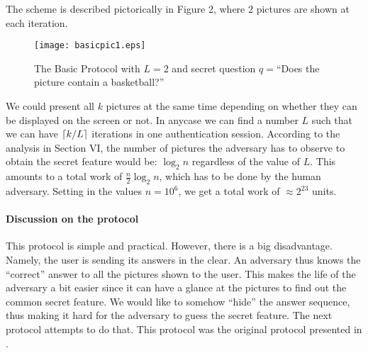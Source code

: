 \documentclass{llncs}
\begin{document}
The scheme is described pictorically in Figure 2, where $2$ pictures are shown at each iteration. 
\begin{figure}[ht]
\centerline{\texttt{[image: basicpic1.eps]}}
\caption{The Basic Protocol with $L=2$ and secret question $q=$``Does the picture contain a basketball?''}
\label{fig6}
\end{figure}
We could present all $k$ pictures at the same time depending on whether they can be displayed on the screen or not. In anycase we can find a number $L$ such that we can have $\left\lceil {{k \mathord{\left/
 {\vphantom {k L}} \right.
 \kern-\nulldelimiterspace} L}} \right\rceil $
iterations in one authentication session. According to the analysis in Section VI, the number of pictures the adversary has to observe to obtain the secret feature would be: $\log _2 n$ regardless of the value of $L$. This amounts to a total work of $\frac{n}{2}\log _2 n$, which has to be done by the human adversary. Setting in the values $n = 10^6$, we get a total work of $ \approx 2^{23} $ units.
\paragraph*{Discussion on the protocol} This protocol is simple and practical. However, there is a big disadvantage. Namely, the user is sending its answers in the clear. An adversary thus knows the ``correct'' answer to all the pictures shown to the user. This makes the life of the adversary a bit easier since it can have a glance at the pictures to find out the common secret feature. We would like to somehow ``hide'' the answer sequence, thus making it hard for the adversary to guess the secret feature. The next protocol attempts to do that. This protocol was the original protocol presented in \cite{hassan}.
\end{document}
